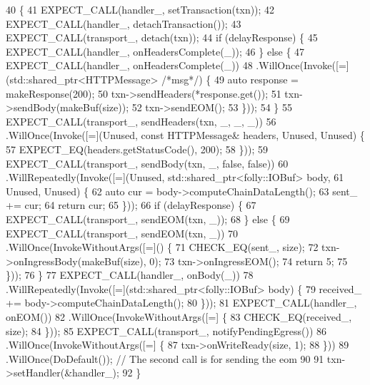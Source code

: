 \begin{DoxyCode}
40                                                           \{
41     EXPECT\_CALL(handler_, setTransaction(txn));
42     EXPECT\_CALL(handler_, detachTransaction());
43     EXPECT\_CALL(transport_, detach(txn));
44     \textcolor{keywordflow}{if} (delayResponse) \{
45       EXPECT\_CALL(handler_, onHeadersComplete(\_));
46     \} \textcolor{keywordflow}{else} \{
47       EXPECT\_CALL(handler_, onHeadersComplete(\_))
48           .WillOnce(Invoke([=](std::shared\_ptr<HTTPMessage> \textcolor{comment}{/*msg*/}) \{
49             \textcolor{keyword}{auto} response = makeResponse(200);
50             txn->sendHeaders(*response.get());
51             txn->sendBody(makeBuf(size));
52             txn->sendEOM();
53           \}));
54     \}
55     EXPECT\_CALL(transport_, sendHeaders(txn, \_, \_, \_))
56       .WillOnce(Invoke([=](Unused, \textcolor{keyword}{const} HTTPMessage& headers, Unused, Unused) \{
57             EXPECT\_EQ(headers.getStatusCode(), 200);
58           \}));
59     EXPECT\_CALL(transport_, sendBody(txn, \_, \textcolor{keyword}{false}, \textcolor{keyword}{false}))
60       .WillRepeatedly(Invoke([=](Unused, std::shared\_ptr<folly::IOBuf> body,
61                                  Unused, Unused) \{
62                                \textcolor{keyword}{auto} cur = body->computeChainDataLength();
63                                sent_ += cur;
64                                \textcolor{keywordflow}{return} cur;
65                              \}));
66     \textcolor{keywordflow}{if} (delayResponse) \{
67       EXPECT\_CALL(transport_, sendEOM(txn, \_));
68     \} \textcolor{keywordflow}{else} \{
69       EXPECT\_CALL(transport_, sendEOM(txn, \_))
70           .WillOnce(InvokeWithoutArgs([=]() \{
71             CHECK\_EQ(sent_, size);
72             txn->onIngressBody(makeBuf(size), 0);
73             txn->onIngressEOM();
74             \textcolor{keywordflow}{return} 5;
75           \}));
76     \}
77     EXPECT\_CALL(handler_, onBody(\_))
78       .WillRepeatedly(Invoke([=](std::shared\_ptr<folly::IOBuf> body) \{
79             received_ += body->computeChainDataLength();
80           \}));
81     EXPECT\_CALL(handler_, onEOM())
82       .WillOnce(InvokeWithoutArgs([=] \{
83             CHECK\_EQ(received_, size);
84           \}));
85     EXPECT\_CALL(transport_, notifyPendingEgress())
86       .WillOnce(InvokeWithoutArgs([=] \{
87             txn->onWriteReady(size, 1);
88           \}))
89       .WillOnce(DoDefault()); \textcolor{comment}{// The second call is for sending the eom}
90 
91     txn->setHandler(&handler_);
92   \}
\end{DoxyCode}


